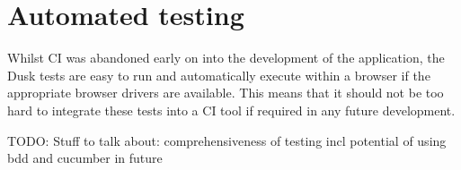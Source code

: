 \section{Automated testing}
Whilst CI was abandoned early on into the development of the application, the Dusk tests are easy to run and automatically execute within a browser if the appropriate browser drivers are available. This means that it should not be too hard to integrate these tests into a CI tool if required in any future development.


TODO: Stuff to talk about:
comprehensiveness of testing incl potential of using bdd and cucumber in future